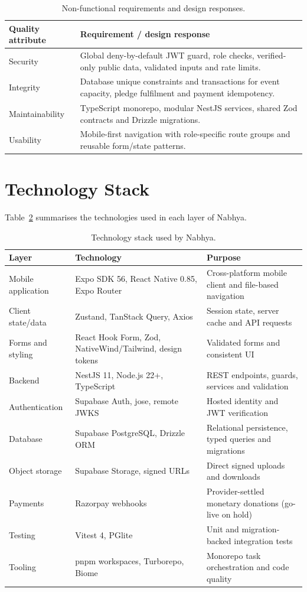 \begin{table}[H]\centering
\caption{Non-functional requirements and design responses.}
\label{tab:nfr}
\begin{tabularx}{\textwidth}{|p{}|X|}
\hline
\textbf{Quality attribute} & \textbf{Requirement / design response}\\\hline
Security & Global deny-by-default JWT guard, role checks, verified-only public data, validated inputs and rate limits.\\\hline
Integrity & Database unique constraints and transactions for event capacity, pledge fulfilment and payment idempotency.\\\hline
Maintainability & TypeScript monorepo, modular NestJS services, shared Zod contracts and Drizzle migrations.\\\hline
Usability & Mobile-first navigation with role-specific route groups and reusable form/state patterns.\\\hline
\end{tabularx}
\end{table}

\section{Technology Stack}
Table~\ref{tab:stack} summarises the technologies used in each layer of Nabhya.

\begin{table}[H]\centering
\caption{Technology stack used by Nabhya.}
\label{tab:stack}
\begin{tabularx}{\textwidth}{|p{}|p{}|X|}
\hline
\textbf{Layer} & \textbf{Technology} & \textbf{Purpose}\\\hline
Mobile application & Expo SDK 56, React Native 0.85, Expo Router & Cross-platform mobile client and file-based navigation\\\hline
Client state/data & Zustand, TanStack Query, Axios & Session state, server cache and API requests\\\hline
Forms and styling & React Hook Form, Zod, NativeWind/Tailwind, design tokens & Validated forms and consistent UI\\\hline
Backend & NestJS 11, Node.js 22+, TypeScript & REST endpoints, guards, services and validation\\\hline
Authentication & Supabase Auth, jose, remote JWKS & Hosted identity and JWT verification\\\hline
Database & Supabase PostgreSQL, Drizzle ORM & Relational persistence, typed queries and migrations\\\hline
Object storage & Supabase Storage, signed URLs & Direct signed uploads and downloads\\\hline
Payments & Razorpay webhooks & Provider-settled monetary donations (go-live on hold)\\\hline
Testing & Vitest 4, PGlite & Unit and migration-backed integration tests\\\hline
Tooling & pnpm workspaces, Turborepo, Biome & Monorepo task orchestration and code quality\\\hline
\end{tabularx}
\end{table}

